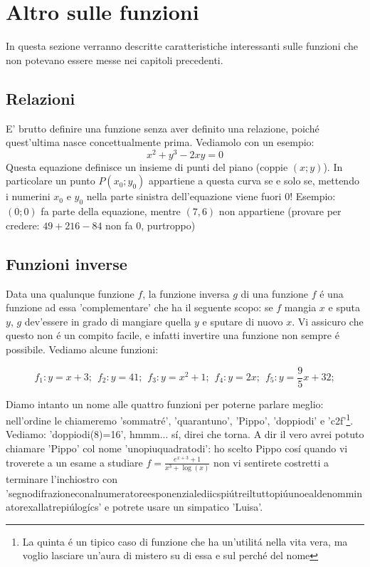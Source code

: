 \section{Altro sulle funzioni}

In questa sezione verranno descritte caratteristiche interessanti sulle funzioni che non potevano essere messe nei capitoli precedenti.

\subsection{Relazioni}

E' brutto definire una funzione senza aver definito una relazione, poich\'e quest'ultima nasce concettualmente prima. Vediamolo con un esempio:
\begin{equation}
x^2+y^3-2xy=0
\end{equation}
Questa equazione definisce un insieme di punti del piano (coppie $(x;y)$). In particolare un punto $P(x_0;y_0)$ appartiene a questa curva se e solo se, mettendo i numerini $x_0$ e $y_0$ nella parte sinistra dell'equazione viene fuori $0$! Esempio: $(0;0)$ fa parte della equazione, mentre $(7,6)$ non appartiene (provare per credere: $49+216-84$ non fa $0$, purtroppo)

\subsection{Funzioni inverse} \label{funzioniinverse}

Data una qualunque funzione $f$, la funzione inversa $g$ di una funzione $f$ \'e una funzione ad essa 'complementare' che ha il seguente scopo: se $f$ mangia $x$ e sputa $y$, $g$ dev'essere in grado di mangiare quella $y$ e sputare di nuovo $x$. Vi assicuro che questo non \'e un compito facile, e infatti invertire una funzione non sempre \'e possibile. Vediamo alcune funzioni:

\begin{equation}
f_1: y=x+3; \hspace{5pt} 
f_2: y=41; \hspace{5pt} 
f_3: y=x^2+1; \hspace{5pt} 
f_4: y=2x;  \hspace{5pt} 
f_5: y=\frac{9}{5}x+32; 
\end{equation}

Diamo intanto un nome alle quattro funzioni per poterne parlare meglio: nell'ordine le chiameremo 'sommatr\'e', 'quarantuno', 'Pippo', 'doppiodi'
e 'c2f'\footnote{La quinta \'e un tipico caso di funzione che ha un'utilit\'a nella vita vera, ma voglio lasciare un'aura di mistero su di essa
e sul perch\'e del nome}. Vediamo: 'doppiodi(8)=16', hmmm... s\'i, direi che torna. A dir il vero avrei potuto chiamare 'Pippo' col nome 'unopiuquadratodi':
ho scelto Pippo cos\'i quando vi troverete a un esame a studiare $f=\frac{e^{x+3}+1}{x^3+\log(x)}$ non vi sentirete costretti a terminare l'inchiostro con
'segnodifrazioneconalnumeratoreesponenzialediicspi\'utreiltuttopi\'uunoealdenomminatorexallatrepi\'ulog\'ics' e potrete usare un simpatico 'Luisa'.

